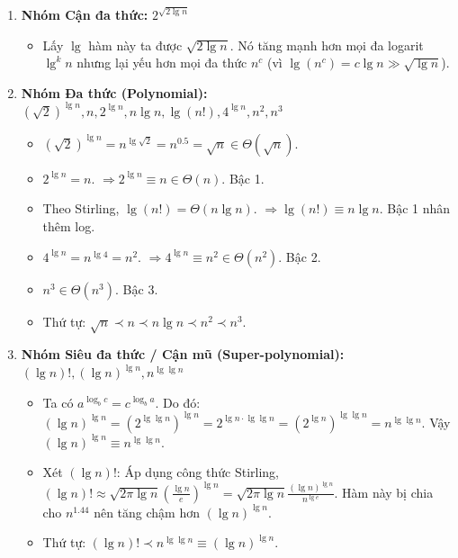 \documentclass[12pt,a4paper]{article}
\begin{document}
\begin{enumerate}[label=\textbf{\arabic*.}]
    \item \textbf{Nhóm Cận đa thức:} $2^{\sqrt{2\lg n}}$
    \begin{itemize}[noitemsep]
        \item Lấy $\lg$ hàm này ta được $\sqrt{2\lg n}$. Nó tăng mạnh hơn mọi đa logarit $\lg^k n$ nhưng lại yếu hơn mọi đa thức $n^c$ (vì $\lg(n^c) = c\lg n \gg \sqrt{\lg n}$).
    \end{itemize}

    \item \textbf{Nhóm Đa thức (Polynomial):} $(\sqrt{2})^{\lg n}, n, 2^{\lg n}, n \lg n, \lg(n!), 4^{\lg n}, n^2, n^3$
    \begin{itemize}[noitemsep]
        \item $(\sqrt{2})^{\lg n} = n^{\lg \sqrt{2}} = n^{0.5} = \sqrt{n} \in \Theta(\sqrt{n})$.
        \item $2^{\lg n} = n$. $\Longrightarrow 2^{\lg n} \equiv n \in \Theta(n)$. Bậc 1.
        \item Theo Stirling, $\lg(n!) = \Theta(n\lg n)$. $\Longrightarrow \lg(n!) \equiv n\lg n$. Bậc 1 nhân thêm log.
        \item $4^{\lg n} = n^{\lg 4} = n^2$. $\Longrightarrow 4^{\lg n} \equiv n^2 \in \Theta(n^2)$. Bậc 2.
        \item $n^3 \in \Theta(n^3)$. Bậc 3.
        \item Thứ tự: $\sqrt{n} \prec n \prec n\lg n \prec n^2 \prec n^3$.
    \end{itemize}

    \item \textbf{Nhóm Siêu đa thức / Cận mũ (Super-polynomial):} $(\lg n)!, (\lg n)^{\lg n}, n^{\lg\lg n}$
    \begin{itemize}[noitemsep]
        \item Ta có $a^{\log_b c} = c^{\log_b a}$. Do đó: $(\lg n)^{\lg n} = (2^{\lg\lg n})^{\lg n} = 2^{\lg n \cdot \lg\lg n} = (2^{\lg n})^{\lg\lg n} = n^{\lg\lg n}$. Vậy $(\lg n)^{\lg n} \equiv n^{\lg\lg n}$.
        \item Xét $(\lg n)!$: Áp dụng công thức Stirling, $(\lg n)! \approx \sqrt{2\pi\lg n}\left(\frac{\lg n}{e}\right)^{\lg n} = \sqrt{2\pi\lg n} \frac{(\lg n)^{\lg n}}{n^{\lg e}}$. Hàm này bị chia cho $n^{1.44}$ nên tăng chậm hơn $(\lg n)^{\lg n}$.
        \item Thứ tự: $(\lg n)! \prec n^{\lg\lg n} \equiv (\lg n)^{\lg n}$.
    \end{itemize}


\end{enumerate}
\end{document}
